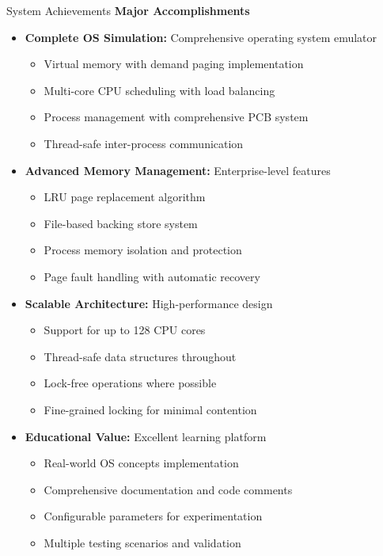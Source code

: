 \documentclass[10pt]{beamer}
\begin{document}
\begin{frame}{System Achievements}
    \textbf{Major Accomplishments}
    
    \begin{itemize}
        \item \textbf{Complete OS Simulation:} Comprehensive operating system emulator
        \begin{itemize}
            \item Virtual memory with demand paging implementation
            \item Multi-core CPU scheduling with load balancing
            \item Process management with comprehensive PCB system
            \item Thread-safe inter-process communication
        \end{itemize}
        
        \item \textbf{Advanced Memory Management:} Enterprise-level features
        \begin{itemize}
            \item LRU page replacement algorithm
            \item File-based backing store system
            \item Process memory isolation and protection
            \item Page fault handling with automatic recovery
        \end{itemize}
        
        \item \textbf{Scalable Architecture:} High-performance design
        \begin{itemize}
            \item Support for up to 128 CPU cores
            \item Thread-safe data structures throughout
            \item Lock-free operations where possible
            \item Fine-grained locking for minimal contention
        \end{itemize}
        
        \item \textbf{Educational Value:} Excellent learning platform
        \begin{itemize}
            \item Real-world OS concepts implementation
            \item Comprehensive documentation and code comments
            \item Configurable parameters for experimentation
            \item Multiple testing scenarios and validation
        \end{itemize}
    \end{itemize}
\end{frame}
\end{document}
